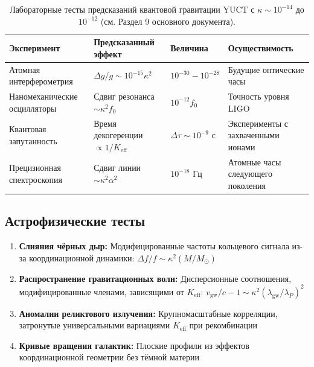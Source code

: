 \documentclass[12pt,a4paper]{article}
\theoremstyle{remark}
\newcommand{\Keff}{K_{\mathrm{eff}}}
\begin{document}
	\begin{table}[htbp]
		\centering
		\begin{tabular}{p{2.8cm}p{4.2cm}p{2.5cm}p{2.5cm}}
			\toprule
			\textbf{Эксперимент} & \textbf{Предсказанный эффект} & \textbf{Величина} & \textbf{Осуществимость} \\
			\midrule
			Атомная интерферометрия & $\Delta g/g \sim 10^{-15}\kappa^2$ & $10^{-30} - 10^{-28}$ & Будущие оптические часы \\
			Наномеханические осцилляторы & Сдвиг резонанса $\sim \kappa^2 f_0$ & $10^{-12} f_0$ & Точность уровня LIGO \\
			Квантовая запутанность & Время декогеренции $\propto 1/\Keff$ & $\Delta\tau \sim 10^{-9}$ с & Эксперименты с захваченными ионами \\
			Прецизионная спектроскопия & Сдвиг линии $\sim \kappa^2 \alpha^2$ & $10^{-18}$ Гц & Атомные часы следующего поколения \\
			\bottomrule
		\end{tabular}
		\caption{Лабораторные тесты предсказаний квантовой гравитации YUCT с $\kappa \sim 10^{-14}$ до $10^{-12}$ (см. Раздел 9 основного документа).}
		\label{tab:lab-tests}
	\end{table}
	
	\subsection{Астрофизические тесты}
	
	\begin{enumerate}
		\item \textbf{Слияния чёрных дыр:} Модифицированные частоты кольцевого сигнала из-за координационной динамики: $\Delta f/f \sim \kappa^2 (M/M_\odot)$
		
		\item \textbf{Распространение гравитационных волн:} Дисперсионные соотношения, модифицированные членами, зависящими от $\Keff$: $v_{\text{gw}}/c - 1 \sim \kappa^2 (\lambda_{\text{gw}}/\lambda_P)^2$
		
		\item \textbf{Аномалии реликтового излучения:} Крупномасштабные корреляции, затронутые универсальными вариациями $\Keff$ при рекомбинации
		
		\item \textbf{Кривые вращения галактик:} Плоские профили из эффектов координационной геометрии без тёмной материи
	\end{enumerate}
	
\end{document}
